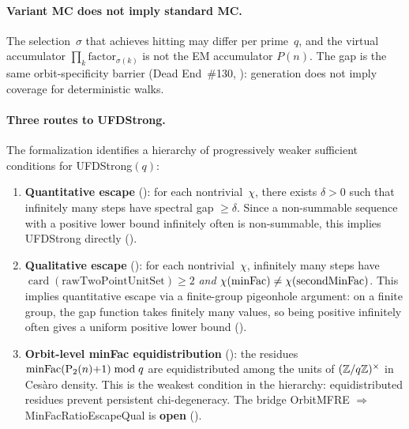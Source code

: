 \paragraph{Variant MC does not imply standard MC.}
The selection~$\sigma$ that achieves hitting may differ per
prime~$q$, and the virtual accumulator
$\prod_k \text{factor}_{\sigma(k)}$ is not the EM accumulator
$P(n)$.  The gap is the same orbit-specificity barrier
(Dead End~\#130,
):
generation does not imply coverage for deterministic walks.

\paragraph{Three routes to UFDStrong.}
The formalization identifies a hierarchy of progressively weaker
sufficient conditions for UFDStrong$(q)$:

\begin{enumerate}[nosep]
\item \textbf{Quantitative escape} ():
  for each nontrivial~$\chi$, there exists $\delta > 0$ such that
  infinitely many steps have spectral gap $\geq \delta$.
  Since a non-summable sequence with a positive lower bound infinitely
  often is non-summable, this implies UFDStrong directly
  ().

\item \textbf{Qualitative escape} ():
  for each nontrivial~$\chi$, infinitely many steps have
  $\operatorname{card}(\text{rawTwoPointUnitSet}) \geq 2$ \emph{and}
  $\chi(\mathrm{minFac}) \neq \chi(\operatorname{secondMinFac})$.
  This implies quantitative escape via a finite-group pigeonhole
  argument: on a finite group, the gap function takes finitely many
  values, so being positive infinitely often gives a uniform positive
  lower bound
  ().

\item \textbf{Orbit-level minFac equidistribution} ():
  the residues $\mathrm{minFac}(\mathrm{P}_{2}(n){+}1) \bmod q$ are equidistributed
  among the units of $(\mathbb{Z}/q\mathbb{Z})^\times$ in Cesàro density.
  This is the weakest condition in the hierarchy: equidistributed
  residues prevent persistent chi-degeneracy.  The bridge
  OrbitMFRE $\Rightarrow$ MinFacRatioEscapeQual is \textbf{open}
  ().
\end{enumerate}

